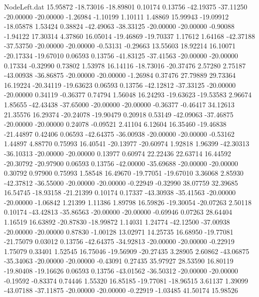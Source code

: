 \begin{filecontents}{NodeLeft.dat}
  15.95872  -18.73016  -18.89801     0.10174    0.13756  -42.19375  -37.11250  -20.00000  -20.00000   -1.26984   -1.10199    1.10111    1.48869
  15.99943  -19.09912  -18.05878     1.53424    0.38824  -42.49063  -38.33125  -20.00000  -20.00000   -0.90088   -1.94122   17.30314    4.37860
  16.05014  -19.46869  -19.70337     1.17612    1.64168  -42.37188  -37.53750  -20.00000  -20.00000   -0.53131   -0.29663   13.55603   18.92214
  16.10071  -20.17334  -19.67010     0.06593    0.13756  -41.83125  -37.41563  -20.00000  -20.00000    0.17334   -0.32990    0.73802    1.53978
  16.14116  -18.73016  -20.37476     2.57280    2.75187  -43.00938  -36.86875  -20.00000  -20.00000   -1.26984    0.37476   27.79889   29.73364
  16.19224  -20.34119  -19.63623     0.06593    0.13756  -42.12812  -37.33125  -20.00000  -20.00000    0.34119   -0.36377    0.74794    1.56048
  16.24293  -19.63623  -19.53583     2.96674    1.85655  -42.43438  -37.65000  -20.00000  -20.00000   -0.36377   -0.46417   34.12613   21.35576
  16.29374  -20.24078  -19.90479     0.20918    0.53149  -42.09063  -37.46875  -20.00000  -20.00000    0.24078   -0.09521    2.41104    6.12604
  16.35460  -19.46838  -21.44897     0.42406    0.06593  -42.64375  -36.00938  -20.00000  -20.00000   -0.53162    1.44897    4.88770    0.75993
  16.40541  -20.13977  -20.60974     1.92818    1.96399  -42.30313  -36.10313  -20.00000  -20.00000    0.13977    0.60974   22.22436   22.63714
  16.44592  -20.30792  -20.97900     0.06593    0.13756  -42.00000  -35.69688  -20.00000  -20.00000    0.30792    0.97900    0.75993    1.58548
  16.49670  -19.77051  -19.67010     3.36068    2.85930  -42.37812  -36.55000  -20.00000  -20.00000   -0.22949   -0.32990   38.07759   32.39685
  16.54745  -18.93158  -21.21399     0.10174    0.17337  -43.30938  -35.41563  -20.00000  -20.00000   -1.06842    1.21399    1.11386    1.89798
  16.59826  -19.30054  -20.07263     2.50118    0.10174  -43.42813  -35.86563  -20.00000  -20.00000   -0.69946    0.07263   28.64404    1.16519
  16.63892  -20.87830  -18.99872     1.14031    1.24774  -42.12500  -37.00938  -20.00000  -20.00000    0.87830   -1.00128   13.02971   14.25735
  16.68950  -19.77081  -21.75079     0.03012    0.13756  -42.64375  -34.92813  -20.00000  -20.00000   -0.22919    1.75079    0.33401    1.52545
  16.75046  -19.56909  -20.27435     3.28905    2.60862  -43.06875  -35.34063  -20.00000  -20.00000   -0.43091    0.27435   35.97927   28.53590
  16.80119  -19.80408  -19.16626     0.06593    0.13756  -43.01562  -36.50312  -20.00000  -20.00000   -0.19592   -0.83374    0.74446    1.55320
  16.85185  -19.77081  -18.96515     3.61137    1.39099  -43.07188  -37.11875  -20.00000  -20.00000   -0.22919   -1.03485   41.50174   15.98526

\end{filecontents}
